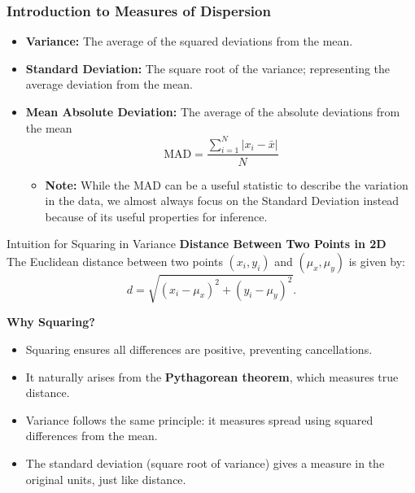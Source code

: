 \documentclass[handout]{beamer} %
\begin{document}
\begin{frame}
\frametitle{Introduction to Measures of Dispersion}
\begin{itemize}
    \item \textbf{Variance:} The average of the squared deviations from the mean.
    \item \textbf{Standard Deviation:} The square root of the variance; representing the average deviation from the mean.
    \item \textbf{Mean Absolute Deviation:} The average of the absolute deviations from the mean
        \begin{equation*}
        \text{MAD} = \frac{\sum_{i=1}^N |x_i - \bar{x}|}{N}
    \end{equation*}
    \begin{itemize}
        \item \textbf{Note:} While the MAD can be a useful statistic to describe the variation in the data, we almost always focus on the Standard Deviation instead because of its useful properties for inference. 
    \end{itemize}
\end{itemize}
\end{frame}


\begin{frame}{Intuition for Squaring in Variance}
    \textbf{Distance Between Two Points in 2D}\\[6pt]
    The Euclidean distance between two points \( (x_i, y_i) \) and \( (\mu_x, \mu_y) \) is given by:
    \[
        d = \sqrt{(x_i - \mu_x)^2 + (y_i - \mu_y)^2}.
    \]
    
    \textbf{Why Squaring?}
    \begin{itemize}
        \item Squaring ensures all differences are positive, preventing cancellations.
        \item It naturally arises from the \textbf{Pythagorean theorem}, which measures true distance.
        \item Variance follows the same principle: it measures spread using squared differences from the mean.
        \item The standard deviation (square root of variance) gives a measure in the original units, just like distance.
    \end{itemize}
    
\end{frame}
\end{document}

